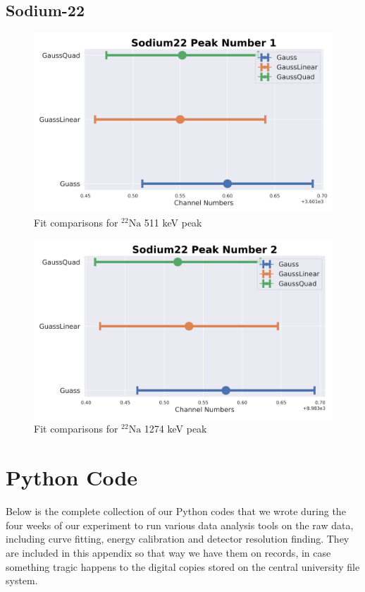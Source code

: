 \documentclass[11pt,a4paper]{article}
\newcommand{\element}[2]{$^{#2}\textrm{#1}$}
\begin{document}
\subsection{Sodium-22}
\begin{figure}[H]
  \centering
  \includegraphics[width=0.95\linewidth]{./Images/Sodium22/FitComparison_Peak1.png}
  \caption{Fit comparisons for \element{Na}{22} 511 keV peak}
\end{figure}

\begin{figure}[H]
  \centering
  \includegraphics[width=0.95\linewidth]{./Images/Sodium22/FitComparison_Peak2.png}
  \caption{Fit comparisons for \element{Na}{22} 1274 keV peak}
\end{figure}
\clearpage

\section{Python Code}
Below is the complete collection of our Python codes that we wrote during the four weeks of our experiment to run various data analysis tools on the raw data, including curve fitting, energy calibration and detector resolution finding. They are included in this appendix so that way we have them on records, in case something tragic happens to the digital copies stored on the central university file system. 
\end{document}
